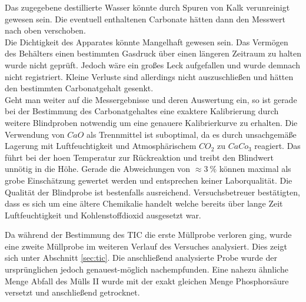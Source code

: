 Das zugegebene destillierte Wasser könnte durch Spuren von Kalk verunreinigt gewesen sein. Die eventuell enthaltenen Carbonate hätten dann den Messwert nach oben verschoben.\\

Die Dichtigkeit des Apparates könnte Mangelhaft gewesen sein. Das Vermögen des Behälters einen bestimmten Gasdruck über einen längeren Zeitraum zu halten wurde nicht geprüft. Jedoch wäre ein großes Leck aufgefallen und wurde demnach nicht registriert. Kleine Verluste sind allerdings nicht auszuschließen und hätten den bestimmten Carbonatgehalt gesenkt.\\

Geht man weiter auf die Messergebnisse und deren Auswertung ein, so ist gerade bei der Bestimmung des Carbonatgehaltes eine exaktere Kalibrierung durch weitere Blindproben notwendig um eine genauere Kalibrierkurve zu erhalten.
Die Verwendung von $CaO$ als Trennmittel ist suboptimal, da es durch unsachgemäße Lagerung mit Luftfeuchtigkeit und Atmosphärischem $CO_2$ zu $CaCo_3$ reagiert. Das führt bei der hoen Temperatur zur Rückreaktion und treibt den Blindwert unnötig in die Höhe. Gerade die Abweichungen von $\approx \SI{3}{\percent}$ können maximal als grobe Einschätzung gewertet werden und entsprechen keiner Laborqualität. Die Qualität der Blindprobe ist bestenfalls ausreichend. Versuchsbetreuer bestätigten, dass es sich um eine ältere Chemikalie handelt welche bereits über lange Zeit Luftfeuchtigkeit und Kohlenstoffdioxid ausgesetzt war. \linebreak

Da während der Bestimmung des TIC die erste Müllprobe verloren ging, wurde eine zweite Müllprobe im weiteren Verlauf des Versuches analysiert. Dies zeigt sich unter Abschnitt \ref{sec:tic}. Die anschließend analysierte Probe wurde der ursprünglichen jedoch genauest-möglich nachempfunden. Eine nahezu ähnliche Menge Abfall des Mülls II wurde mit der exakt gleichen Menge Phosphorsäure versetzt und anschließend getrocknet.\linebreak

